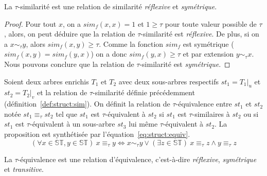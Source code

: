 \begin{proposition}
    La $\tau$-similarité est une relation de similarité \emph{réflexive} et \emph{symétrique}.
\end{proposition}

\begin{proof}
    Pour tout $x$, on a $sim_f(x, x) = 1$ et $1 \ge \tau$ pour toute valeur possible de $\tau$, alors, on peut déduire que la relation de $\tau$-similarité est \emph{réflexive}.
    De plus, si on a $x \sim_\tau y$, alors $sim_f(x, y) \ge \tau$.
    Comme la fonction $sim_f$ est symétrique ($sim_f(x, y) = sim_f(y, x)$) on a donc $sim_f(y, x) \ge \tau$ et par extension $y \sim_\tau x$.
    Nous pouvons conclure que la relation de $\tau$-similarité est \emph{symétrique}.
\end{proof}

\begin{definition}
    \label{def:struct:equiv}
    Soient deux arbres enrichis $T_1$ et $T_2$ avec deux sous-arbres respectifs $st_1 = T_1|_u$ et $st_2 = T_2|_v$ et la relation de $\tau$-similarité définie précédemment (définition~\ref{def:struct:sim}).
    On définit la relation de $\tau$-équivalence entre $st_1$ et $st_2$ notée $st_1 \equiv_\tau st_2$ tel que $st_1$ est $\tau$-équivalent à $st_2$ si $st_1$ est $\tau$-similaires à $st_2$ ou si $st_1$ est  $\tau$-équivalent à un sous-arbre $st_3$ lui même $\tau$-équivalent à $st_2$.
    La proposition est synthétisée par l'équation~\ref{eq:struct:equiv}.
    \begin{equation}
        (\forall x \in \mathbb{ST}, y \in \mathbb{ST}) ~ x \equiv_\tau y \iff x \sim_\tau y \lor (\exists z \in \mathbb{ST}) ~ x \equiv_\tau z \land y \equiv_\tau z \label{eq:struct:equiv}
    \end{equation}
\end{definition}

\begin{proposition}
    La $\tau$-équivalence est une relation d'équivalence, c'est-à-dire \emph{réflexive}, \emph{symétrique} et \emph{transitive}.
\end{proposition}

